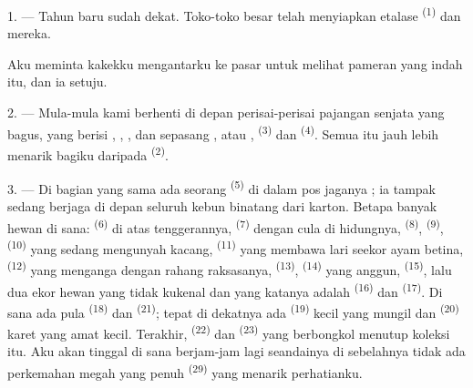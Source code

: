 \VUsaut{4.0mm}
\VUsaut{2.0mm}
\VUsaut{3.4mm}

1. --- Tahun baru sudah dekat. Toko-toko besar telah menyiapkan
etalase  \textsuperscript{(1)} dan  mereka.

Aku meminta kakekku mengantarku ke pasar untuk melihat pameran yang
indah itu, dan ia setuju.

2. --- Mula-mula kami berhenti di depan perisai-perisai pajangan
senjata yang bagus, yang berisi , ,
,  dan sepasang ,
atau ,  \textsuperscript{(3)} dan
 \textsuperscript{(4)}. Semua itu jauh lebih menarik
bagiku daripada  \textsuperscript{(2)}.

\VUsaut{3.0mm}
\VUsaut{2.6mm}

3. --- Di bagian yang sama ada seorang 
\textsuperscript{(5)} di dalam pos jaganya ; ia tampak sedang berjaga
di depan seluruh kebun binatang dari karton. Betapa banyak hewan di
sana:  \textsuperscript{(6)} di atas tenggerannya,
 \textsuperscript{(7)} dengan cula di hidungnya,
 \textsuperscript{(8)}, 
\textsuperscript{(9)},  \textsuperscript{(10)} yang
sedang mengunyah kacang,  \textsuperscript{(11)} yang
membawa lari seekor ayam betina, 
\textsuperscript{(12)} yang menganga dengan rahang raksasanya,
 \textsuperscript{(13)}, 
\textsuperscript{(14)} yang anggun, 
\textsuperscript{(15)}, lalu dua ekor hewan yang tidak kukenal dan
yang katanya adalah  \textsuperscript{(16)} dan
 \textsuperscript{(17)}. Di sana ada pula  \textsuperscript{(18)} dan 
\textsuperscript{(21)}; tepat di dekatnya ada 
\textsuperscript{(19)} kecil yang mungil dan 
\textsuperscript{(20)} karet yang amat kecil. Terakhir,  \textsuperscript{(22)} dan 
\textsuperscript{(23)} yang berbongkol menutup koleksi itu. Aku akan
tinggal di sana berjam-jam lagi seandainya di sebelahnya tidak ada
perkemahan megah yang penuh 
\textsuperscript{(29)} yang menarik perhatianku.

